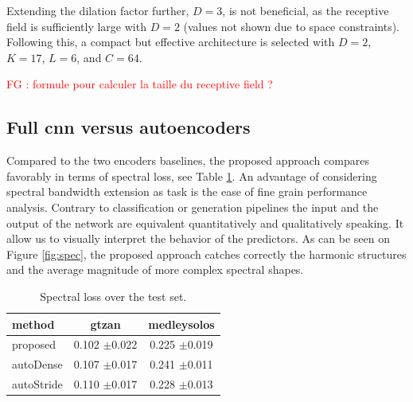 \documentclass{article}
\newcommand{\fg}[1]{\textcolor{red}{FG : #1}}
\begin{document}
Extending the dilation factor further, $D=3$, is not beneficial, as the receptive field is sufficiently large with $D=2$ (values not shown due to space constraints). Following this, a compact but effective architecture is selected with $D=2$, $K=17$, $L=6$, and $C=64$.

\fg{formule pour calculer la taille du receptive field ?}




\subsection*{Full cnn versus autoencoders}

Compared to the two encoders baselines, the proposed approach compares favorably in terms of spectral loss, see Table \ref{tab:loss}. An advantage of considering spectral bandwidth extension as task is the ease of fine grain performance analysis. Contrary to classification or generation pipelines the input and the output of the network are equivalent quantitatively and qualitatively speaking. It allow us to visually interpret the behavior of the predictors. As can be seen on Figure \ref{fig:spec}, the proposed approach catches correctly the harmonic structures and the average magnitude of more complex spectral shapes.

\begin{table}[t]
  \begin{center}
\begin{tabular}{lcc}
method & gtzan & medleysolos \\
\hline
proposed & 0.102 $\pm$0.022 & 0.225 $\pm$0.019 \\
autoDense & 0.107 $\pm$0.017 & 0.241 $\pm$0.011 \\
autoStride & 0.110 $\pm$0.017 & 0.228 $\pm$0.013 \\
\end{tabular}
\caption{Spectral loss over the test set.}
\label{tab:loss}
\end{center}
\vspace{-4mm}
\end{table}
\end{document}
